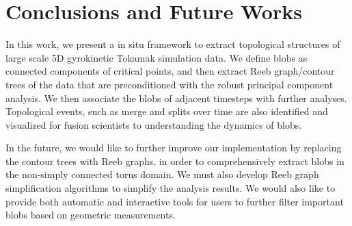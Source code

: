 \section{Conclusions and Future Works}
\label{sec:conclusions}

In this work, we present a in situ framework to extract topological structures of large scale 5D gyrokinetic Tokamak simulation data.  We define blobs as connected components of critical points, and then extract Reeb graph/contour trees of the data that are preconditioned with the robust principal component analysis.  We then associate the blobs of adjacent timesteps with further analyses.  Topological events, such as merge and splits over time are also identified and visualized for fusion scientists to understanding the dynamics of blobs.  

In the future, we would like to further improve our implementation by replacing the contour trees with Reeb graphs, in order to comprehensively extract blobs in the non-simply connected torus domain.  We must also develop Reeb graph simplification algorithms to simplify the analysis results.  We would also like to provide both automatic and interactive tools for users to further filter important blobs based on geometric measurements.  

\iffalse
Guidelines for selecting persistence threshold.  Learning.  
Tracking over time.
Event visualization.  
In situ integration with ADIOS. 
Further collaboration with fusion scientists.  
\fi